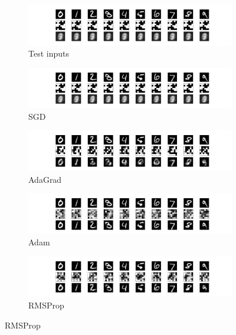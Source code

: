 \documentclass[preprint,5p,compress]{elsarticle}
\begin{document}
\begin{figure}[htbp]
  \centering
  \begin{subfigure}{0.48\textwidth}
    \includegraphics[width=\textwidth,trim={14em 18em 14em 2em},clip]{basic-36-tanh-sgd-xent.pdf}
    \caption{\label{Fig.opt.orig}Test inputs}
  \end{subfigure}

  \vspace{1em}
  
  \begin{subfigure}{0.48\textwidth}
    \includegraphics[width=\textwidth,trim={14em 2em 14em 18em},clip]{basic-36-tanh-sgd-xent.pdf}
    \caption{\label{Fig.opt.sgd}SGD}
  \end{subfigure}
  \begin{subfigure}{0.48\textwidth}
    \includegraphics[width=\textwidth,trim={14em 2em 14em 19em},clip]{basic-36-tanh-adagrad-xent.pdf}
    \caption{\label{Fig.opt.adagrad}AdaGrad}
  \end{subfigure}

  \vspace{1em}
  
  \begin{subfigure}{0.48\textwidth}
    \includegraphics[width=\textwidth,trim={14em 2em 14em 19em},clip]{basic-36-tanh-adam-xent.pdf}
    \caption{\label{Fig.opt.adam}Adam}
  \end{subfigure}
  \begin{subfigure}{0.48\textwidth}
    \includegraphics[width=\textwidth,trim={14em 2em 14em 19em},clip]{basic-36-tanh-rmsprop-xent.pdf}
    \caption{\label{Fig.opt.rmsprop}RMSProp}
  \end{subfigure}
 

\end{figure}
\end{document}
